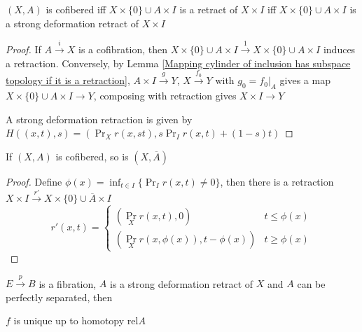 \documentclass[main]{subfiles}
\begin{document}
\begin{proposition}\label{A->X is a cofibration iff retraction exists}
$(X,A)$ is cofibered iff $X\times\{0\}\cup A\times I$ is a retract of $X\times I$ iff $X\times\{0\}\cup A\times I$ is a strong deformation retract of $X\times I$
\end{proposition}

\begin{proof}
If $A\xrightarrow{i}X$ is a cofibration, then $X\times\{0\}\cup A\times I\xrightarrow{1}X\times\{0\}\cup A\times I$ induces a retraction. Conversely, by Lemma \ref{Mapping cylinder of inclusion has subspace topology if it is a retraction}, $A\times I\xrightarrow{g}Y$, $X\xrightarrow{f_0}Y$ with $g_0=f_0|_A$ gives a map $X\times\{0\}\cup A\times I\to Y$, composing with retraction gives $X\times I\to Y$ \par
A strong deformation retraction is given by $H((x,t),s)=(\Pr_X r(x,st),s\Pr_Ir(x,t)+(1-s)t)$
\end{proof}

\begin{lemma}
If $(X,A)$ is cofibered, so is $(X,\overline A)$
\end{lemma}

\begin{proof}
Define $\displaystyle\phi(x)=\inf_{t\in I}\{\textstyle\Pr_Ir(x,t)\neq0\}$, then there is a retraction $X\times I\xrightarrow{r'}X\times\{0\}\cup\overline A\times I$
\[r'(x,t)=\begin{cases}
\left(\Pr_Xr(x,t),0\right) &t\leq\phi(x) \\
\left(\Pr_Xr(x,\phi(x)),t-\phi(x)\right) &t\geq\phi(x)
\end{cases}\]
\end{proof}

\begin{lemma}\label{p:E->B fibration, i:A->X strong deformation retract, A can be perfectly separated => i has LLP}
$E\xrightarrow{p}B$ is a fibration, $A$ is a strong deformation retract of $X$ and $A$ can be perfectly separated, then
\begin{center}
\end{center}
$f$ is unique up to homotopy $\mathrm{rel}A$
\end{lemma}
\end{document}
